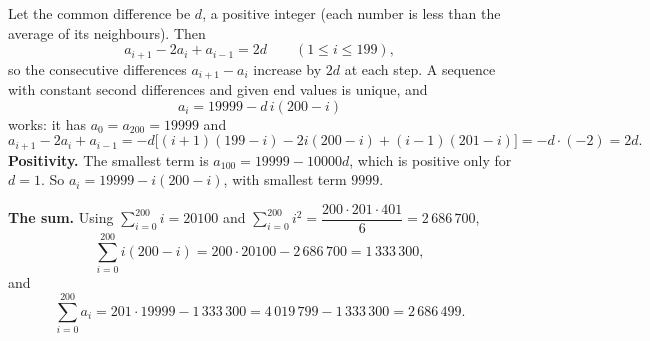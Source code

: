 Let the common difference be $d$, a positive integer (each number is less than the average of its neighbours). Then
\[a_{i+1}-2a_i+a_{i-1}=2d\qquad(1\le i\le199),\]
so the consecutive differences $a_{i+1}-a_i$ increase by $2d$ at each step. A sequence with constant second differences and given end values is unique, and
\[a_i=19999-d\,i(200-i)\]
works: it has $a_0=a_{200}=19999$ and
\[a_{i+1}-2a_i+a_{i-1}=-d\bigl[(i+1)(199-i)-2i(200-i)+(i-1)(201-i)\bigr]=-d\cdot(-2)=2d .\]
\textbf{Positivity.} The smallest term is $a_{100}=19999-10000d$, which is positive only for $d=1$. So $a_i=19999-i(200-i)$, with smallest term $9999$.

\textbf{The sum.} Using $\sum_{i=0}^{200}i=20100$ and $\sum_{i=0}^{200}i^2=\dfrac{200\cdot201\cdot401}{6}=2\,686\,700$,
\[\sum_{i=0}^{200}i(200-i)=200\cdot20100-2\,686\,700=1\,333\,300,\]
and
\[\sum_{i=0}^{200}a_i=201\cdot19999-1\,333\,300=4\,019\,799-1\,333\,300=\boxed{2\,686\,499}.\]
